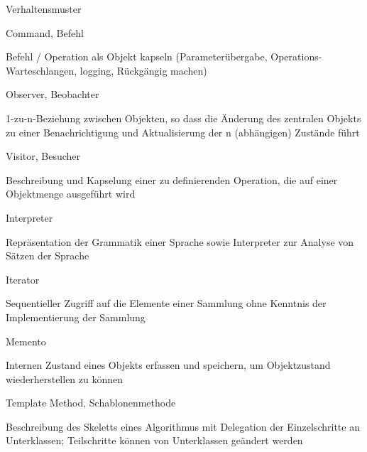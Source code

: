 \documentclass[a4paper]{article}
\begin{document}
\begin{multicols}{3}
  Verhaltensmuster
  \begin{itemize*}
    \item Command, Befehl
          \begin{itemize*}
            \item Befehl / Operation als Objekt kapseln (Parameterübergabe, Operations-Warteschlangen, logging, Rückgängig machen)
          \end{itemize*}
    \item Observer, Beobachter
          \begin{itemize*}
            \item 1-zu-n-Beziehung zwischen Objekten, so dass die Änderung des zentralen Objekts zu einer Benachrichtigung und Aktualisierung der n (abhängigen) Zustände führt
          \end{itemize*}
    \item Visitor, Besucher
          \begin{itemize*}
            \item Beschreibung und Kapselung einer zu definierenden Operation, die auf einer Objektmenge ausgeführt wird
          \end{itemize*}
    \item Interpreter
          \begin{itemize*}
            \item Repräsentation der Grammatik einer Sprache sowie Interpreter zur Analyse von Sätzen der Sprache
          \end{itemize*}
    \item Iterator
          \begin{itemize*}
            \item Sequentieller Zugriff auf die Elemente einer Sammlung ohne Kenntnis der Implementierung der Sammlung
          \end{itemize*}
    \item Memento
          \begin{itemize*}
            \item Internen Zustand eines Objekts erfassen und speichern, um Objektzustand wiederherstellen zu können
          \end{itemize*}
    \item Template Method, Schablonenmethode
          \begin{itemize*}
            \item Beschreibung des Skeletts eines Algorithmus mit Delegation der Einzelschritte an Unterklassen; Teilschritte können von Unterklassen geändert werden

\end{itemize*}
\end{itemize*}
\end{multicols}
\end{document}
